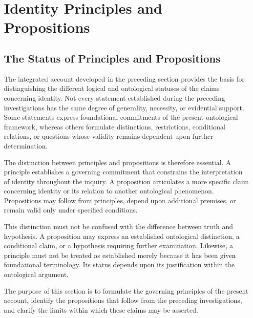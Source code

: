 
\section{Identity Principles and Propositions}
\label{sec:identity-principles-and-propositions}


\subsection{The Status of Principles and Propositions}

The integrated account developed in the preceding section
provides the basis for distinguishing the different logical
and ontological statuses of the claims concerning identity.
Not every statement established during the preceding
investigations has the same degree of generality, necessity,
or evidential support. Some statements express foundational
commitments of the present ontological framework, whereas
others formulate distinctions, restrictions, conditional
relations, or questions whose validity remains dependent
upon further determination.

The distinction between principles and propositions is
therefore essential. A principle establishes a governing
commitment that constrains the interpretation of identity
throughout the inquiry. A proposition articulates a more
specific claim concerning identity or its relation to
another ontological phenomenon. Propositions may follow
from principles, depend upon additional premises, or remain
valid only under specified conditions.

This distinction must not be confused with the difference
between truth and hypothesis. A proposition may express
an established ontological distinction, a conditional
claim, or a hypothesis requiring further examination.
Likewise, a principle must not be treated as established
merely because it has been given foundational terminology.
Its status depends upon its justification within the
ontological argument.

The purpose of this section is to formulate the governing
principles of the present account, identify the propositions
that follow from the preceding investigations, and clarify
the limits within which these claims may be asserted.

